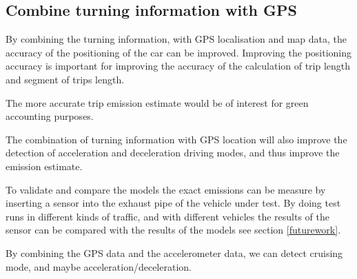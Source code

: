 \subsection{Combine turning information with GPS }

By combining the turning information, with GPS localisation and map data, the accuracy of the positioning of the car can be improved. Improving the positioning accuracy is important for improving the accuracy of the calculation of trip length and segment of trips length.

The more accurate trip emission estimate would be of interest for green accounting purposes.

The combination of turning information with GPS location will also improve the detection of acceleration and deceleration driving modes, and thus improve the emission estimate.


To validate and compare the models the exact emissions can be measure by inserting a sensor into the exhaust pipe of the vehicle under test. By doing test runs in different kinds of traffic, and with different vehicles the results of the sensor can be compared with the results of the models see section \ref{futurework}.

By combining the GPS data and the accelerometer data, we can detect cruising mode, and maybe acceleration/deceleration.